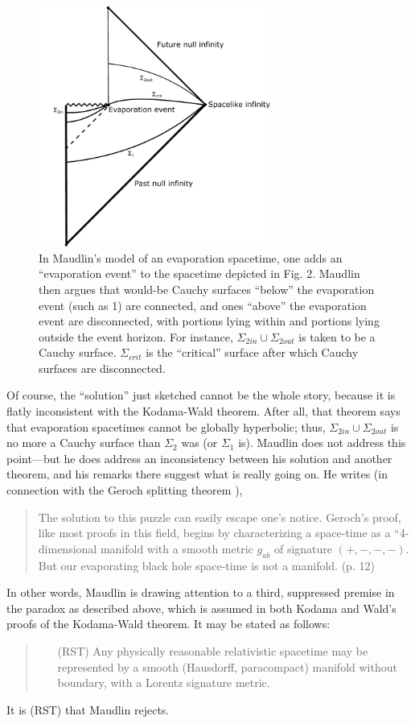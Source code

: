 \documentclass[authoryear,12pt,3p]{jowarticle}
\begin{document}
\begin{figure}[h]    \centering
   \includegraphics[width=3in]{BHE_Penrose_Diagram_--_Maudlin.pdf}
   \caption{\label{MaudlinFig} In Maudlin’s model of an evaporation spacetime, one adds an “evaporation event” to the spacetime depicted in Fig. 2. Maudlin then argues that would-be Cauchy surfaces “below” the evaporation event (such as 1) are connected, and ones “above” the evaporation event are disconnected, with portions lying within and portions lying outside the event horizon. For instance, $\Sigma_{2in}\cup\Sigma_{2out}$ is taken to be a Cauchy surface. $\Sigma_{\mathit{crit}}$ is the “critical” surface after which Cauchy surfaces are disconnected.}
\end{figure}

Of course, the ``solution'' just sketched cannot be the whole story, because it is flatly inconsistent with the Kodama-Wald theorem.  After all, that theorem says that evaporation spacetimes cannot be globally hyperbolic; thus, $\Sigma_{2in}\cup\Sigma_{2out}$ is no more a Cauchy surface than $\Sigma_2$ was (or $\Sigma_1$ is).  Maudlin does not address this point---but he does address an inconsistency between his solution and another theorem, and his remarks there suggest what is really going on.  He writes (in connection with the Geroch splitting theorem \citep{GerochSplitting}),
\begin{quote}
The	solution to	this puzzle	can	easily escape one's notice.	Geroch's proof,	like most proofs in	this field,	begins by characterizing a	space-time as a “4-dimensional manifold	with a	smooth metric $g_{ab}$ of signature	$(+,-,-,-)$.  But our evaporating black	hole space-time	is not a manifold. (p. 12)
\end{quote}
In other words, Maudlin is drawing attention to a third, suppressed premise in the paradox as described above, which is assumed in both Kodama and Wald's proofs of the Kodama-Wald theorem.  It may be stated as follows:
\begin{quote}
\begin{itemize}
\item[(RST)] Any physically reasonable relativistic spacetime may be represented by a smooth (Hausdorff, paracompact) manifold without boundary, with a Lorentz signature metric.
\end{itemize}
\end{quote}
It is (RST) that Maudlin rejects.
\end{document}
